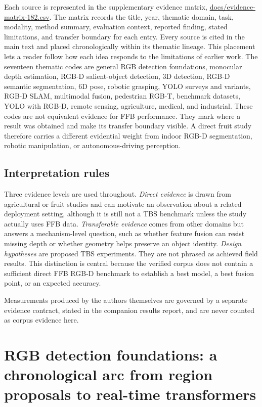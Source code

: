 Each source is represented in the supplementary evidence matrix, \url{docs/evidence-matrix-182.csv}. The matrix records the title, year, thematic domain, task, modality, method summary, evaluation context, reported finding, stated limitations, and transfer boundary for each entry. Every source is cited in the main text and placed chronologically within its thematic lineage. This placement lets a reader follow how each idea responds to the limitations of earlier work. The seventeen thematic codes are general RGB detection foundations, monocular depth estimation, RGB-D salient-object detection, 3D detection, RGB-D semantic segmentation, 6D pose, robotic grasping, YOLO surveys and variants, RGB-D SLAM, multimodal fusion, pedestrian RGB-T, benchmark datasets, YOLO with RGB-D, remote sensing, agriculture, medical, and industrial. These codes are not equivalent evidence for FFB performance. They mark where a result was obtained and make its transfer boundary visible. A direct fruit study therefore carries a different evidential weight from indoor RGB-D segmentation, robotic manipulation, or autonomous-driving perception.

\subsection{Interpretation rules}
\label{sec:rules}

Three evidence levels are used throughout. \textit{Direct evidence} is drawn from agricultural or fruit studies and can motivate an observation about a related deployment setting, although it is still not a TBS benchmark unless the study actually uses FFB data. \textit{Transferable evidence} comes from other domains but answers a mechanism-level question, such as whether feature fusion can resist missing depth or whether geometry helps preserve an object identity. \textit{Design hypotheses} are proposed TBS experiments. They are not phrased as achieved field results. This distinction is central because the verified corpus does not contain a sufficient direct FFB RGB-D benchmark to establish a best model, a best fusion point, or an expected accuracy.

Measurements produced by the authors themselves are governed by a separate evidence contract, stated in the companion results report, and are never counted as corpus evidence here.

\section{RGB detection foundations: a chronological arc from region proposals to real-time transformers}

